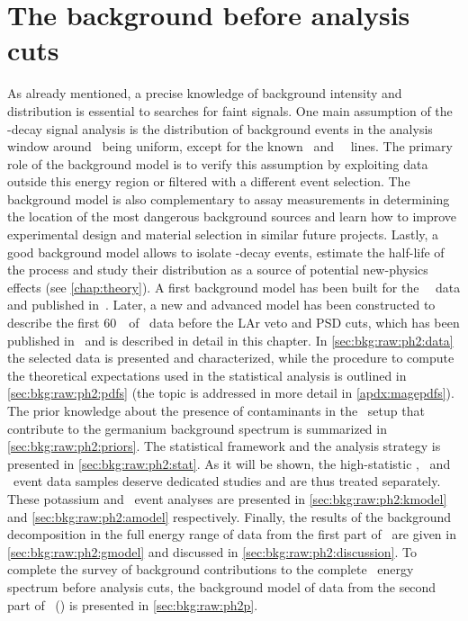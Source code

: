 
\chapter{The background before analysis cuts}\label{chap:bkg:raw:ph2}

As already mentioned, a precise knowledge of background intensity and distribution is
essential to searches for faint signals. One main assumption of the \onbb-decay signal
analysis is the distribution of background events in the analysis window around \qbb\
being uniform, except for the known \Tl\ and \Bil\ \g\ lines. The primary role of the
background model is to verify this assumption by exploiting data outside this energy
region or filtered with a different event selection. The background model is also
complementary to assay measurements in determining the location of the most dangerous
background sources and learn how to improve experimental design and material selection in
similar future projects. Lastly, a good background model allows to isolate \nnbb-decay
events, estimate the half-life of the process and study their distribution as a source of
potential new-physics effects (see \cref{chap:theory}).
\newpar
A first background model has been built for the \gerda\ \phaseone\ data and published
in~\cite{Agostini2013a}. Later, a new and advanced model has been constructed to describe
the first 60~\kgyr\ of \phasetwo\ data before the LAr veto and PSD cuts, which has been
published in~\cite{Agostini2019b} and is described in detail in this chapter. In
\cref{sec:bkg:raw:ph2:data} the selected data is presented and characterized, while the
procedure to compute the theoretical expectations used in the statistical analysis is
outlined in \cref{sec:bkg:raw:ph2:pdfs} (the topic is addressed in more detail in
\cref{apdx:magepdfs}). The prior knowledge about the presence of contaminants in the
\gerda\ setup that contribute to the germanium background spectrum is summarized in
\cref{sec:bkg:raw:ph2:priors}. The statistical framework and the analysis strategy is
presented in \cref{sec:bkg:raw:ph2:stat}. As it will be shown, the high-statistic \kvn,
\kvz\ and \a\ event data samples deserve dedicated studies and are thus treated
separately. These potassium and \a\ event analyses are presented in
\cref{sec:bkg:raw:ph2:kmodel} and \cref{sec:bkg:raw:ph2:amodel} respectively. Finally, the
results of the background decomposition in the full energy range of data from the first
part of \phasetwo\ are given in \cref{sec:bkg:raw:ph2:gmodel} and discussed in
\cref{sec:bkg:raw:ph2:discussion}. To complete the survey of background contributions to
the complete \gerdatwo\ energy spectrum before analysis cuts, the background model of data
from the second part of \phasetwo\ (\phasetwop) is presented in \cref{sec:bkg:raw:ph2p}.

